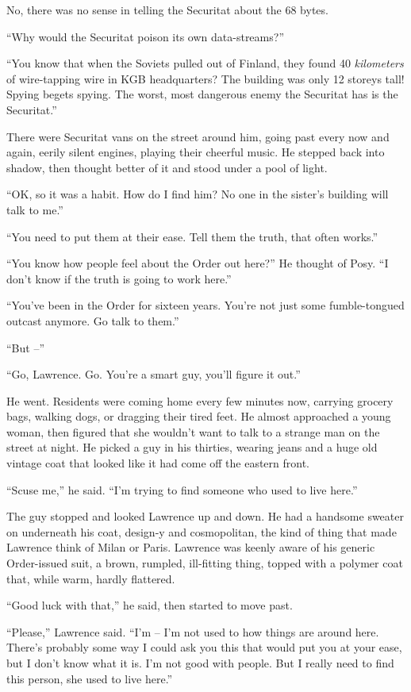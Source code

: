 No, there was no sense in telling the Securitat about the 68 bytes.

“Why would the Securitat poison its own data-streams?”

“You know that when the Soviets pulled out of Finland, they found 40 
\emph{kilometers} of wire-tapping wire in KGB headquarters? The 
building was only 12 storeys tall! Spying begets spying. The worst, 
most dangerous enemy the Securitat has is the Securitat.”

There were Securitat vans on the street around him, going past every 
now and again, eerily silent engines, playing their cheerful music. He 
stepped back into shadow, then thought better of it and stood under a 
pool of light.

“OK, so it was a habit. How do I find him? No one in the sister's 
building will talk to me.”

“You need to put them at their ease. Tell them the truth, that often 
works.”

“You know how people feel about the Order out here?” He thought of 
Posy. “I don't know if the truth is going to work here.”

“You've been in the Order for sixteen years. You're not just some 
fumble-tongued outcast anymore. Go talk to them.”

“But --”

“Go, Lawrence. Go. You're a smart guy, you'll figure it out.”

He went. Residents were coming home every few minutes now, carrying 
grocery bags, walking dogs, or dragging their tired feet. He almost 
approached a young woman, then figured that she wouldn't want to talk 
to a strange man on the street at night. He picked a guy in his 
thirties, wearing jeans and a huge old vintage coat that looked like it 
had come off the eastern front.

“Scuse me,” he said. “I'm trying to find someone who used to live 
here.”

The guy stopped and looked Lawrence up and down. He had a handsome 
sweater on underneath his coat, design-y and cosmopolitan, the kind of 
thing that made Lawrence think of Milan or Paris. Lawrence was keenly 
aware of his generic Order-issued suit, a brown, rumpled, ill-fitting 
thing, topped with a polymer coat that, while warm, hardly flattered.

“Good luck with that,” he said, then started to move past.

“Please,” Lawrence said. “I'm -- I'm not used to how things are 
around here. There's probably some way I could ask you this that would 
put you at your ease, but I don't know what it is. I'm not good with 
people. But I really need to find this person, she used to live here.”

